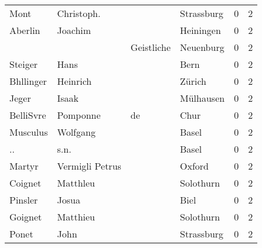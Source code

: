 \begin{center}
\begin{tiny}
\begin{longtabu}{llllrr}
                     Mont &                         Christoph. &             &                                  Strassburg &          0 &         2 \\
                  Aberlin &                            Joachim &             &                                   Heiningen &          0 &         2 \\
                          &                                    &  Geistliche &                                   Neuenburg &          0 &         2 \\
                  Steiger &                               Hans &             &                                        Bern &          0 &         2 \\
                Bhllinger &                           Heinrich &             &                                      Zürich &          0 &         2 \\
                    Jeger &                              Isaak &             &                                   Mülhausen &          0 &         2 \\
                BelliSvre &                           Pomponne &          de &                                        Chur &          0 &         2 \\
                 Musculus &                           Wolfgang &             &                                       Basel &          0 &         2 \\
                       .. &                               s.n. &             &                                       Basel &          0 &         2 \\
                   Martyr &                    Vermigli Petrus &             &                                      Oxford &          0 &         2 \\
                  Coignet &                           Matthleu &             &                                   Solothurn &          0 &         2 \\
                  Pinsler &                              Josua &             &                                        Biel &          0 &         2 \\
                  Goignet &                           Matthieu &             &                                   Solothurn &          0 &         2 \\
                    Ponet &                               John &             &                                  Strassburg &          0 &         2 \\

\end{longtabu}
\end{tiny}
\end{center}
